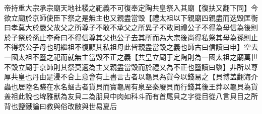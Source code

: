 帝持重大宗承宗廟天地社稷之祀義不可復奉定陶共皇祭入其廟【復扶又翻下同】今欲立廟於京師使臣下祭之是無主也又親盡當毁【禮太祖以下親廟四親盡而迭毁匡衡曰孝莫大於嚴父故父之所尊子不敢不承父之所異子不敢同禮公子不得為母信為後則於子祭於孫止李奇曰不得信尊其父也公子去其所而為大宗後尚得私祭其母為孫則止不得祭公子母也明繼祖不復顧其私祖母此皆親盡當毁之義也師古曰信讀曰申】空去一國太祖不墮之祀而就無主當毁不正之義【共皇立廟于定陶則為一國太祖之廟萬世不毁立廟于京師則其祭莫適為主又親盡當毁而於禮又為不正也墮讀曰隳】非所以尊厚共皇也丹由是浸不合上意會有上書言古者以龜貝為貨今以錢易之【貝博盖翻海介蟲也居陸名贆在水名蜬古者貨貝而寶龜周有泉至秦廢貝而行錢其後王莽以龜貝為貨盖祖此說也埤雅獸為友貝二為朋貝中肉如科斗而有首尾貝之字從目從八言貝目之所背也鹽鐵論曰教與俗改敝與世易夏后